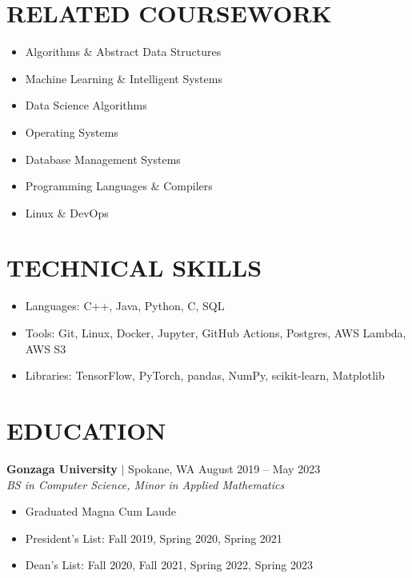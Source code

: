 \documentclass[11pt, a4paper, roman]{moderncv}
\newcommand{\education}[5]{
	\textbf{#1} $|$ #2
	\hfill#3
	\\\textit{#4}
	#5
	\vspace{2mm}
}
\begin{document}
\maketitle
\vspace*{-12mm}

\begin{multicols}{2}

\section{RELATED COURSEWORK}
{\begin{itemize}
    \item Algorithms \& Abstract Data Structures
    \item Machine Learning \& Intelligent Systems
    \item Data Science Algorithms
    \item Operating Systems
    \item Database Management Systems
    \item Programming Languages \& Compilers
    \item Linux \& DevOps
  \end{itemize}
}

\columnbreak

\section{TECHNICAL SKILLS}
{\begin{itemize}
    \item Languages: C++, Java, Python, C, SQL
    \item Tools: Git, Linux, Docker, Jupyter, GitHub Actions, Postgres, AWS Lambda, AWS S3
    \item Libraries: TensorFlow, PyTorch, pandas, NumPy, scikit-learn, Matplotlib
  \end{itemize}
}
\end{multicols}

\vspace*{-4mm}
\section{EDUCATION}

\education{Gonzaga University}{Spokane, WA}{August 2019 -- May 2023}{BS in Computer Science, Minor in Applied Mathematics}
	{\begin{itemize}
		\item Graduated Magna Cum Laude
    		\item President's List: Fall 2019, Spring 2020, Spring 2021
    		\item Dean's List: Fall 2020, Fall 2021, Spring 2022, Spring 2023
  	\end{itemize}
}
\end{document}
